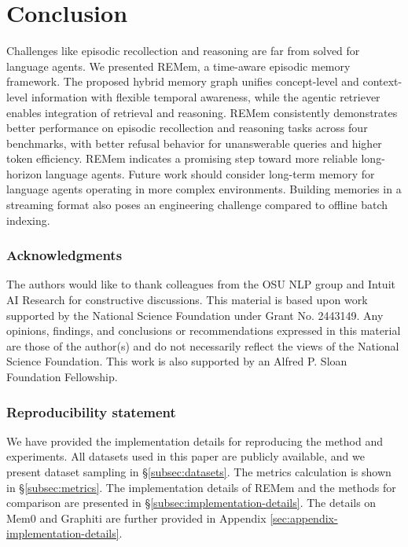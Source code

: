 \documentclass{article} %
\newcommand{\ours}{REMem\xspace}
\begin{document}
\section{Conclusion}
Challenges like episodic recollection and reasoning are far from solved for language agents.
We presented \ours, a time-aware episodic memory framework. 
The proposed hybrid memory graph unifies concept-level and context-level information with flexible temporal awareness, while the agentic retriever enables integration of retrieval and reasoning.
\ours consistently demonstrates better performance on episodic recollection and reasoning tasks across four benchmarks, with better refusal behavior for unanswerable queries and higher token efficiency.
\ours indicates a promising step toward more reliable long-horizon language agents.
Future work should consider long-term memory for language agents operating in more complex environments.
Building memories in a streaming format also poses an engineering challenge compared to offline batch indexing.



\subsubsection*{Acknowledgments}

The authors would like to thank colleagues from the OSU NLP group and Intuit AI Research for constructive discussions.
This material is based upon work supported by the National Science Foundation under Grant No. 2443149.
Any opinions, findings, and conclusions or recommendations expressed in this material are those of the author(s) and do not necessarily reflect the views of the National Science Foundation.
This work is also supported by an Alfred P. Sloan Foundation Fellowship.


\subsubsection*{Reproducibility statement}

We have provided the implementation details for reproducing the method and experiments.
All datasets used in this paper are publicly available, and we present dataset sampling in \S \ref{subsec:datasets}.
The metrics calculation is shown in \S \ref{subsec:metrics}.
The implementation details of \ours and the methods for comparison are presented in \S \ref{subsec:implementation-details}. 
The details on Mem0 and Graphiti are further provided in Appendix \ref{sec:appendix-implementation-details}.
\end{document}
